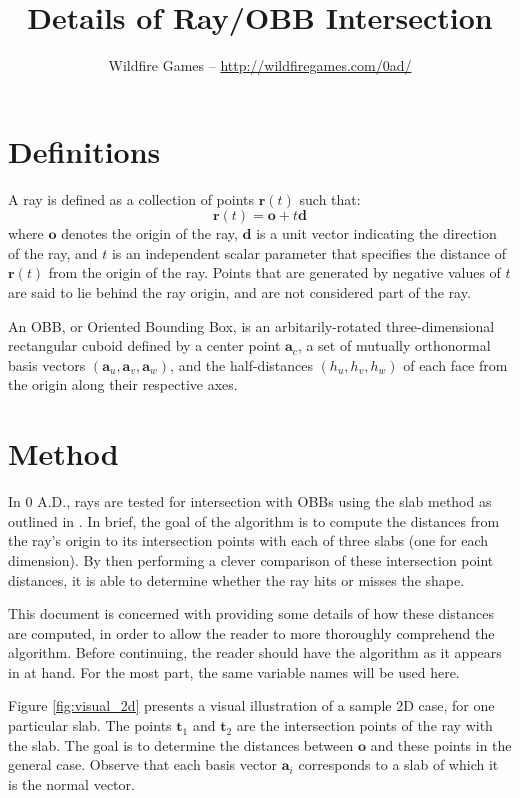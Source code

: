 \documentclass[a4paper,10pt]{article}
\title{Details of Ray/OBB Intersection}
\author{Wildfire Games -- \url{http://wildfiregames.com/0ad/}}
\begin{document}
\maketitle

\section{Definitions}
A ray is defined as a collection of points $\mathbf{r}(t)$ such that:
\begin{equation*}
\mathbf{r}(t) = \mathbf{o} + t \mathbf{d}
\end{equation*}
where $\mathbf{o}$ denotes the origin of the ray, $\mathbf{d}$ is a unit vector indicating the direction of the ray, and $t$ is an independent scalar parameter that specifies the distance of $\mathbf{r}(t)$ from the origin of the ray. Points that are generated by negative values of $t$ are said to lie behind the ray origin, and are not considered part of the ray.

An OBB, or Oriented Bounding Box, is an arbitarily-rotated three-dimensional rectangular cuboid defined by a center point $\mathbf{a}_c$, a set of mutually orthonormal basis vectors $(\mathbf{a}_u, \mathbf{a}_v, \mathbf{a}_w)$, and the half-distances $(h_u, h_v, h_w)$ of each face from the origin along their respective axes.

\section{Method}
In 0 A.D., rays are tested for intersection with OBBs using the slab method as outlined in \cite{real_time_rendering_3}. In brief, the goal of the algorithm is to compute the distances from the ray's origin to its intersection points with each of three slabs (one for each dimension). By then performing a clever comparison of these intersection point distances, it is able to determine whether the ray hits or misses the shape.

This document is concerned with providing some details of how these distances are computed, in order to allow the reader to more thoroughly comprehend the algorithm. Before continuing, the reader should have the algorithm as it appears in \cite{real_time_rendering_3} at hand. For the most part, the same variable names will be used here.

Figure \ref{fig:visual_2d} presents a visual illustration of a sample 2D case, for one particular slab. The points $\mathbf{t}_1$ and $\mathbf{t}_2$ are the intersection points of the ray with the slab. The goal is to determine the distances between $\mathbf{o}$ and these points in the general case. Observe that each basis vector $\mathbf{a}_i$ corresponds to a slab of which it is the normal vector.
\end{document}
